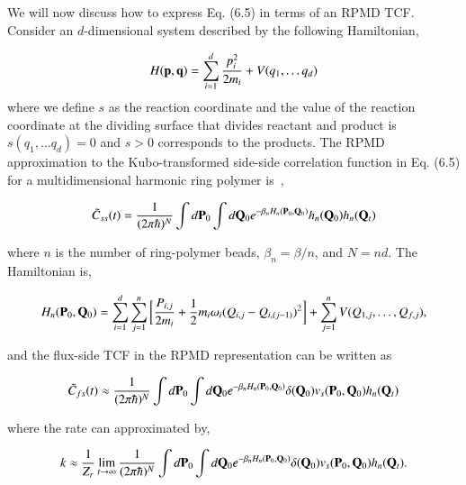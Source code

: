 \documentclass[phd,tocprelim]{cornell}
\begin{document}
We will now discuss how to express Eq. (6.5) in terms of an RPMD TCF.
Consider an $d$-dimensional system described by the following Hamiltonian,

\begin{equation}
H({\bf{p}},{\bf{q}}) = \sum_{i=1}^{d} \frac{p_i^2}{2m_i} + V(q_1, \dots q_d)
\end{equation}
where we define $s$ as the reaction coordinate and the value of the reaction coordinate at the dividing surface that divides reactant and product is $s(q_1, \dots q_d)=0$ and $s>0$ corresponds to the products. The RPMD approximation to the Kubo-transformed side-side correlation function in Eq. (6.5)  for a multidimensional harmonic ring polymer  is~\cite{CHANDLER1981}, 

\begin{equation} 
\tilde{C}_{ss}(t) = \frac{1}{(2\pi \hbar)^N} \int d{\bf{P}}_0  \int d{\bf{Q}}_0 e^{-\beta_n H_n({\bf{P}}_0,{\bf{Q}}_0)} h_n({\bf{Q}}_0)h_n({\bf{Q}}_t)
\end{equation}

where $n$ is the number of ring-polymer beads, $\beta_n = \beta/n$, and $N=nd$. The Hamiltonian is, 

\begin{equation}
H_n({\bf{P}}_0,{\bf{Q}}_0)= \sum_{i=1}^d \sum_{j=1}^n \bigg[ \frac{P_{i,j}}{2m_i} + \frac{1}{2} m_i \omega_i ( Q_{i,j} - Q_{i, (j-1)})^2\bigg] \\
+ \sum_{j=1}^{n} V(Q_{1,j}, \dots, Q_{f,j}),
\end{equation}

and the flux-side TCF in the RPMD representation can be written as 

\begin{equation} 
\tilde{C}_{fs}(t) \approx \frac{1}{(2\pi \hbar)^N} \int d{\bf{P}}_0  \int d{\bf{Q}}_0 e^{-\beta_n H_n({\bf{P}}_0,{\bf{Q}}_0)} \delta ({\bf{Q}}_0)v_s({\bf{P}}_0,{\bf{Q}}_0)h_n({\bf{Q}}_t)
\end{equation}

where the rate can approximated by, 

 \begin{equation}
 k \approx \frac{1}{Z_r} \lim_{t\to \infty} \frac{1}{(2\pi \hbar)^N} \int d{\bf{P}}_0  \int d{\bf{Q}}_0 e^{-\beta_n H_n({\bf{P}}_0,{\bf{Q}}_0)} \delta ({\bf{Q}}_0)v_s({\bf{P}}_0,{\bf{Q}}_0)h_n({\bf{Q}}_t).
 \end{equation}
 
\end{document}
